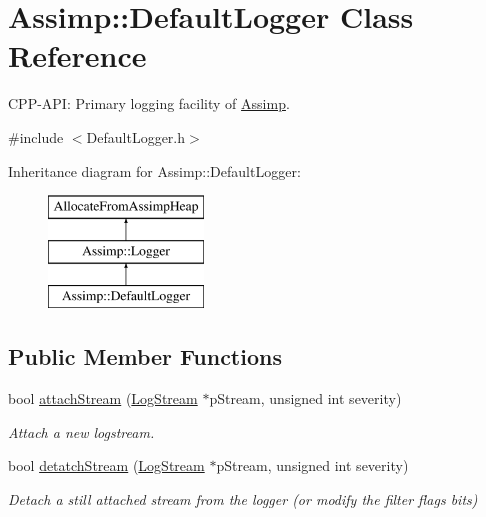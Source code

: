 \hypertarget{class_assimp_1_1_default_logger}{\section{Assimp\-:\-:Default\-Logger Class Reference}
\label{class_assimp_1_1_default_logger}
}


C\-P\-P-\/\-A\-P\-I\-: Primary logging facility of \hyperlink{namespace_assimp}{Assimp}.  




{\ttfamily \#include $<$Default\-Logger.\-h$>$}

Inheritance diagram for Assimp\-:\-:Default\-Logger\-:\begin{figure}[H]
\begin{center}
\leavevmode
\includegraphics[height=3.000000cm]{class_assimp_1_1_default_logger}
\end{center}
\end{figure}
\subsection*{Public Member Functions}
\begin{DoxyCompactItemize}
\item 
bool \hyperlink{class_assimp_1_1_default_logger_abc0ca7a337f8c3e38eca0eb45bb1ccf0}{attach\-Stream} (\hyperlink{class_assimp_1_1_log_stream}{Log\-Stream} $\ast$p\-Stream, unsigned int severity)
\begin{DoxyCompactList}\small\item\em Attach a new logstream. \end{DoxyCompactList}\item 
bool \hyperlink{class_assimp_1_1_default_logger_a2615f1d1624f1d742d0cf2dd4a5cccc8}{detatch\-Stream} (\hyperlink{class_assimp_1_1_log_stream}{Log\-Stream} $\ast$p\-Stream, unsigned int severity)
\begin{DoxyCompactList}\small\item\em Detach a still attached stream from the logger (or modify the filter flags bits) \end{DoxyCompactList}\end{DoxyCompactItemize}
